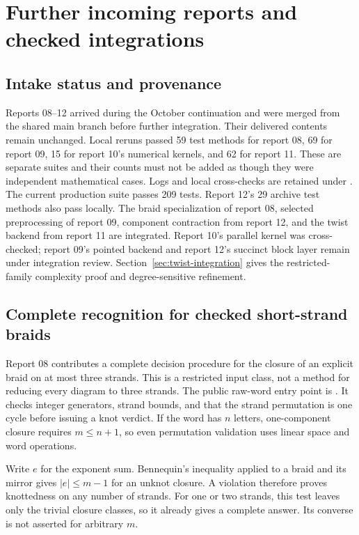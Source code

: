 \section{Further incoming reports and checked integrations}
\label{sec:incoming}

\subsection{Intake status and provenance}
Reports 08--12 arrived during the October continuation and were merged
from the shared main branch before further integration. Their delivered
contents remain unchanged. Local reruns passed 59 test methods for report
08, 69 for report 09, 15 for report 10's numerical kernels, and 62 for
report 11. These are separate suites and their counts must not be added
as though they were independent mathematical cases. Logs and local
cross-checks are retained under . The current
production suite passes 209 tests. Report 12's 29 archive test methods also
pass locally. The braid specialization of report 08, selected preprocessing
of report 09, component contraction from report 12, and the twist backend
from report 11 are integrated. Report 10's parallel kernel was cross-checked;
report 09's pointed backend and report 12's succinct block layer remain
under integration review. Section~\ref{sec:twist-integration} gives the
restricted-family complexity proof and degree-sensitive refinement.

\subsection{Complete recognition for checked short-strand braids}
Report 08 contributes a complete decision procedure for the closure of
an explicit braid on at most three strands. This is a restricted input
class, not a method for reducing every diagram to three strands. The
public raw-word entry point is . It checks
integer generators, strand bounds, and that the strand permutation is
one cycle before issuing a knot verdict. If the word has $n$ letters,
one-component closure requires $m\le n+1$, so even permutation validation
uses linear space and word operations.

Write $e$ for the exponent sum. Bennequin's inequality applied to a
braid and its mirror gives $|e|\le m-1$ for an unknot closure. A violation
therefore proves knottedness on any number of strands. For one or two
strands, this test leaves only the trivial closure classes, so it already
gives a complete answer. Its converse is not asserted for arbitrary $m$.

